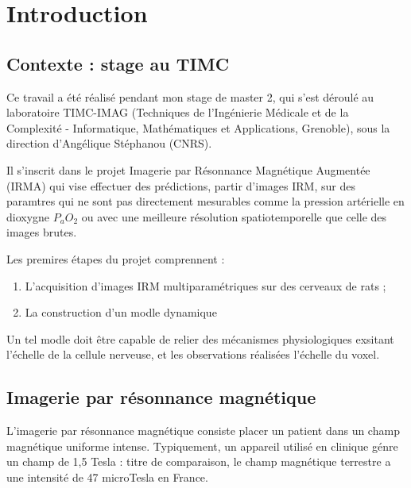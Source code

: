 \section{Introduction}

\subsection{Contexte : stage au TIMC}

Ce travail a \'et\'e r\'ealis\'e pendant mon stage de master 2, qui s'est d\'eroul\'e au laboratoire TIMC-IMAG %
(Techniques de l'Ingénierie M\'edicale et de la Complexit\'e - Informatique, Mathématiques et Applications, Grenoble), %
sous la direction d'Angélique Stéphanou (CNRS). 

\par
Il s'inscrit dans le projet Imagerie par Résonnance Magn\'etique Augment\'ee (IRMA) qui vise  effectuer des pr\'edictions, %
 partir d'images IRM, sur des paramtres qui ne sont pas directement mesurables comme la pression art\'erielle en dioxygne $P_aO_2$ %
ou avec une meilleure r\'esolution spatiotemporelle que celle des images brutes.

\par
Les premires \'etapes du projet comprennent :
\begin{enumerate}
\item L'acquisition d'images IRM multiparam\'etriques sur des cerveaux de rats ;
\item La construction d'un modle dynamique 
\end{enumerate}

Un tel modle doit \^etre capable de relier des m\'ecanismes physiologiques exsitant  l'\'echelle de la cellule nerveuse, %
et les observations r\'ealis\'ees  l'\'echelle du voxel.







\subsection{Imagerie par r\'esonnance magn\'etique}%

L'imagerie par r\'esonnance magn\'etique consiste  placer un patient dans un champ magn\'etique uniforme intense. %
Typiquement, un appareil utilis\'e en clinique g\'enre un champ de 1,5 Tesla : %
 titre de comparaison, le champ magn\'etique terrestre a une intensit\'e de 47 microTesla en France.

